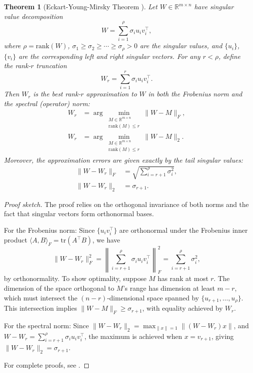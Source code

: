 \documentclass{article}
\theoremstyle{plain}
\newtheorem{theorem}{Theorem}[section]
\theoremstyle{definition}
\theoremstyle{remark}
\begin{document}
\begin{theorem}[Eckart-Young-Mirsky Theorem \cite{eckart1936approximation}]
\label{thm:eym}
Let $W \in \mathbb{R}^{m \times n}$ have singular value decomposition
\[
W = \sum_{i=1}^{\rho} \sigma_i u_i v_i^\top,
\]
where $\rho = \mathrm{rank}(W)$, $\sigma_1 \geq \sigma_2 \geq \cdots \geq \sigma_{\rho} > 0$ are the singular values, and $\{u_i\}$, $\{v_i\}$ are the corresponding left and right singular vectors. For any $r < \rho$, define the rank-$r$ truncation
\[
W_r = \sum_{i=1}^{r} \sigma_i u_i v_i^\top.
\]
Then $W_r$ is the best rank-$r$ approximation to $W$ in both the Frobenius norm and the spectral (operator) norm:
\begin{align}
W_r &= \arg\min_{\substack{M \in \mathbb{R}^{m \times n} \\ \mathrm{rank}(M) \leq r}} \|W - M\|_F, \\
W_r &= \arg\min_{\substack{M \in \mathbb{R}^{m \times n} \\ \mathrm{rank}(M) \leq r}} \|W - M\|_2.
\end{align}
Moreover, the approximation errors are given exactly by the tail singular values:
\begin{align}
\|W - W_r\|_F &= \sqrt{\sum_{i=r+1}^{\rho} \sigma_i^2}, \label{eq:eym_frob}\\
\|W - W_r\|_2 &= \sigma_{r+1}. \label{eq:eym_spec}
\end{align}
\end{theorem}

\begin{proof}[Proof sketch]
The proof relies on the orthogonal invariance of both norms and the fact that singular vectors form orthonormal bases. 

For the Frobenius norm: Since $\{u_i v_i^\top\}$ are orthonormal under the Frobenius inner product $\langle A, B \rangle_F = \mathrm{tr}(A^\top B)$, we have
\[
\|W - W_r\|_F^2 = \left\|\sum_{i=r+1}^{\rho} \sigma_i u_i v_i^\top\right\|_F^2 
= \sum_{i=r+1}^{\rho} \sigma_i^2,
\]
by orthonormality. To show optimality, suppose $M$ has rank at most $r$. The dimension of the space orthogonal to $M$'s range has dimension at least $m - r$, which must intersect the $(n - r)$-dimensional space spanned by $\{u_{r+1}, \ldots, u_{\rho}\}$. This intersection implies $\|W - M\|_F \geq \sigma_{r+1}$, with equality achieved by $W_r$.

For the spectral norm: Since $\|W - W_r\|_2 = \max_{\|x\|=1} \|(W - W_r)x\|$, and $W - W_r = \sum_{i=r+1}^{\rho} \sigma_i u_i v_i^\top$, the maximum is achieved when $x = v_{r+1}$, giving $\|W - W_r\|_2 = \sigma_{r+1}$.

For complete proofs, see \cite{eckart1936approximation, stewart1990matrix}.
\end{proof}
\end{document}
